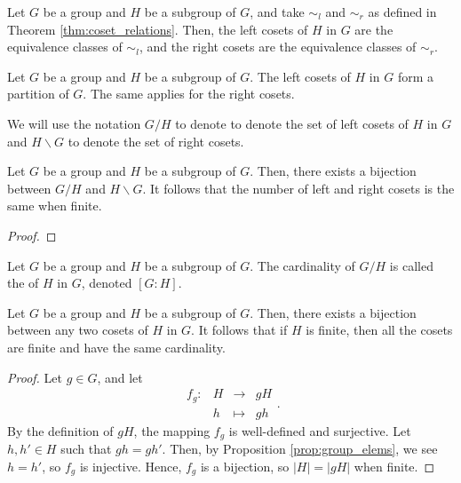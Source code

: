 \begin{cor}
Let $ G $ be a group and $ H $ be a subgroup of $ G $, and take $ \sim_l $ and $ \sim_r $ as defined in Theorem \ref{thm:coset_relations}. Then, the left cosets of $ H $ in $ G $ are the equivalence classes of $ \sim_l $, and the right cosets are the equivalence classes of $ \sim_r $.
\end{cor}

\begin{cor}\label{cor:cosets_partition}
Let $ G $ be a group and $ H $ be a subgroup of $ G $. The left cosets of $ H $ in $ G $ form a partition of $ G $. The same applies for the right cosets.
\end{cor}

We will use the notation $ G/H $ to denote to denote the set of left cosets of $ H $ in $ G $ and $ H\backslash G $ to denote the set of right cosets.

\begin{prop}
Let $ G $ be a group and $ H $ be a subgroup of $ G $. Then, there exists a bijection between $ G/H $ and $ H\backslash G $. It follows that the number of left and right cosets is the same when finite.
\end{prop}
\begin{proof}
\end{proof}

\begin{defn}
Let $ G $ be a group and $ H $ be a subgroup of $ G $. The cardinality of $ G/H $ is called the  of $ H $ in $ G $, denoted $ [G:H] $.
\end{defn}

\begin{prop} \label{prop:cosets_cardinality}
Let $ G $ be a group and $ H $ be a subgroup of $ G $. Then, there exists a bijection between any two cosets of $ H $ in $ G $. It follows that if $ H $ is finite, then all the cosets are finite and have the same cardinality.
\end{prop}
\begin{proof}
Let $ g\in G $, and let
\begin{equation*}
    \begin{array}{rccc}
        f_g: & H & \to & gH \\
        & h & \mapsto & gh
    \end{array}.
\end{equation*}
By the definition of $ gH $, the mapping $ f_g $ is well-defined and surjective. Let $ h,h'\in H $ such that $ gh=gh' $. Then, by Proposition \ref{prop:group_elems}, we see $ h=h' $, so $ f_g $ is injective. Hence, $ f_g $ is a bijection, so $ \lvert H\rvert=\lvert gH\rvert $ when finite.
\end{proof}

